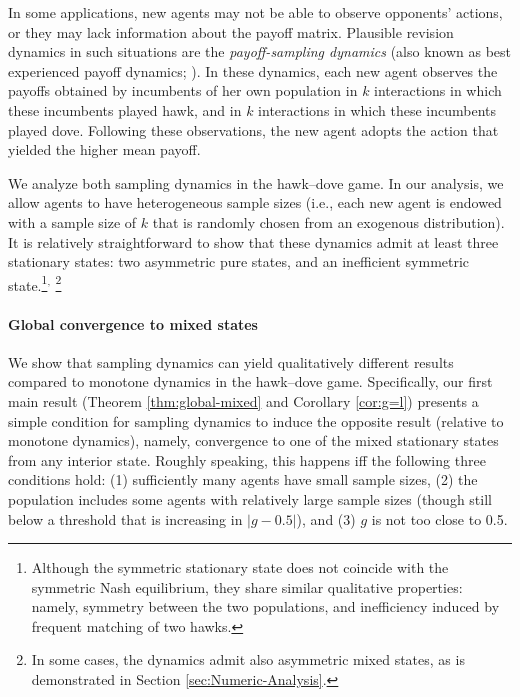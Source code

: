 \documentclass[12pt]{article}
\numberwithin{equation}{section}
\numberwithin{figure}{section}
\theoremstyle{definition}
\theoremstyle{plain}
\theoremstyle{plain}
\theoremstyle{plain}
\theoremstyle{remark}
\theoremstyle{plain}
\theoremstyle{plain}
\begin{document}
In some applications, new agents may not be able to observe  opponents' actions, or they may lack information about the payoff matrix. Plausible revision dynamics in such situations are the \emph{payoff-sampling dynamics}  (also known as best experienced payoff dynamics; \citealp{osborne1998games,sethi2000stability}). 
In these dynamics, each new agent observes the payoffs obtained by incumbents of her own population in $k$ interactions in which these incumbents played hawk, and in $k$ interactions in which these incumbents played dove. Following these observations, the new agent adopts the action that yielded the higher mean payoff.

We analyze both sampling dynamics in the hawk--dove game. In our analysis, we allow agents to have heterogeneous sample sizes (i.e., each new agent is endowed with a sample size of $k$ that is randomly chosen from an exogenous distribution). 
It is relatively straightforward to show that these dynamics admit at least three stationary states: 
two asymmetric pure states, and an inefficient symmetric state.\footnote{
Although the  symmetric stationary state does not coincide with the symmetric Nash equilibrium, they share similar qualitative properties: namely, symmetry between the two populations, and inefficiency induced by frequent matching of two hawks.}$^{,}$
\footnote{In some cases, the dynamics admit also asymmetric mixed states,
as is demonstrated in Section \ref{sec:Numeric-Analysis}.} 

\paragraph{Global convergence to mixed states} 
We show that sampling dynamics can yield qualitatively different results compared to monotone dynamics in the hawk--dove game. Specifically, our first main result (Theorem \ref{thm:global-mixed} and Corollary \ref{cor:g=l}) presents a simple condition for sampling dynamics to induce the opposite result (relative to monotone dynamics), namely, convergence to one of the mixed stationary states from any interior state. Roughly speaking, this happens iff the following three conditions hold:
 (1) sufficiently many agents have small sample sizes, (2) 
the population includes some agents with relatively large sample sizes (though still below a threshold that is increasing in $|g-0.5|$), and (3) $g$  is not too close to 0.5. 
\end{document}
